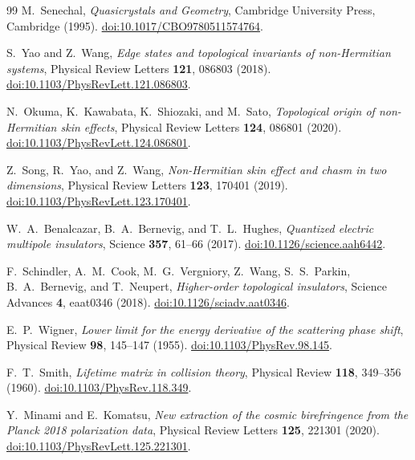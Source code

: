 \documentclass[11pt,a4paper]{article}
\theoremstyle{definition}
\begin{document}
\begin{thebibliography}{99}
M.~Senechal, \textit{Quasicrystals and Geometry}, Cambridge University Press, Cambridge (1995). \href{https://doi.org/10.1017/CBO9780511574764}{doi:10.1017/CBO9780511574764}.

S.~Yao and Z.~Wang, \textit{Edge states and topological invariants of non-Hermitian systems}, Physical Review Letters \textbf{121}, 086803 (2018). \href{https://doi.org/10.1103/PhysRevLett.121.086803}{doi:10.1103/PhysRevLett.121.086803}.

N.~Okuma, K.~Kawabata, K.~Shiozaki, and M.~Sato, \textit{Topological origin of non-Hermitian skin effects}, Physical Review Letters \textbf{124}, 086801 (2020). \href{https://doi.org/10.1103/PhysRevLett.124.086801}{doi:10.1103/PhysRevLett.124.086801}.

Z.~Song, R.~Yao, and Z.~Wang, \textit{Non-Hermitian skin effect and chasm in two dimensions}, Physical Review Letters \textbf{123}, 170401 (2019). \href{https://doi.org/10.1103/PhysRevLett.123.170401}{doi:10.1103/PhysRevLett.123.170401}.

W.~A.~Benalcazar, B.~A.~Bernevig, and T.~L.~Hughes, \textit{Quantized electric multipole insulators}, Science \textbf{357}, 61--66 (2017). \href{https://doi.org/10.1126/science.aah6442}{doi:10.1126/science.aah6442}.

F.~Schindler, A.~M.~Cook, M.~G.~Vergniory, Z.~Wang, S.~S.~Parkin, B.~A.~Bernevig, and T.~Neupert, \textit{Higher-order topological insulators}, Science Advances \textbf{4}, eaat0346 (2018). \href{https://doi.org/10.1126/sciadv.aat0346}{doi:10.1126/sciadv.aat0346}.

E.~P.~Wigner, \textit{Lower limit for the energy derivative of the scattering phase shift}, Physical Review \textbf{98}, 145--147 (1955). \href{https://doi.org/10.1103/PhysRev.98.145}{doi:10.1103/PhysRev.98.145}.

F.~T.~Smith, \textit{Lifetime matrix in collision theory}, Physical Review \textbf{118}, 349--356 (1960). \href{https://doi.org/10.1103/PhysRev.118.349}{doi:10.1103/PhysRev.118.349}.

Y.~Minami and E.~Komatsu, \textit{New extraction of the cosmic birefringence from the Planck 2018 polarization data}, Physical Review Letters \textbf{125}, 221301 (2020). \href{https://doi.org/10.1103/PhysRevLett.125.221301}{doi:10.1103/PhysRevLett.125.221301}.


\end{thebibliography}
\end{document}
